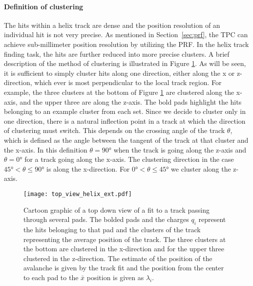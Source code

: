 \paragraph{Definition of clustering}
The hits within a helix track are dense and the position resolution of an individual hit is not very precise. As mentioned in Section~\ref{sec:prf}, the TPC can achieve sub-millimeter position resolution by utilizing the PRF. In the helix track finding task, the hits are further reduced into more precise clusters. A brief description of the method of clustering is illustrated in Figure \ref{fig:topview}. As will be seen, it is sufficient to simply cluster hits along one direction, either along the x or z-direction, which ever is most perpendicular to the local track region. For example, the three clusters at the bottom of Figure \ref{fig:topview} are clustered along the x-axis, and the upper three are along the z-axis. The bold pads highlight the hits belonging to an example cluster from each set. Since we decide to cluster only in one direction, there is a natural inflection point in a track at which the direction of clustering must switch. This depends on the crossing angle of the track $\theta$, which is defined as the angle between the tangent of the track  at that cluster and the x-axis. In this definition $\theta = \ang{90}$ when the track is going along the z-axis and $\theta = \ang{0}$ for a track going along the x-axis.  The clustering direction in the case $\ang{45} < \theta \leq \ang{90} $ is along the x-direction. For $\ang{0} < \theta \leq \ang{45}$ we cluster along the z-axis. 

 

\begin{figure}[!htb]
\centering
\texttt{[image: top\_view\_helix\_ext.pdf]}
\caption{Cartoon graphic of a top down view of a fit to a track passing through several pads. The bolded pads and the charges $q_i$ represent the hits belonging to that pad and the clusters of the track representing the average position of the track. The three clusters at the bottom are clustered in the x-direction and for the upper three clustered in the z-direction. The estimate of the position of the avalanche is given by the track fit and the position from the center to each pad to the $\bar{x}$ position is given as $\lambda_i$.}
\label{fig:topview}
\end{figure}

